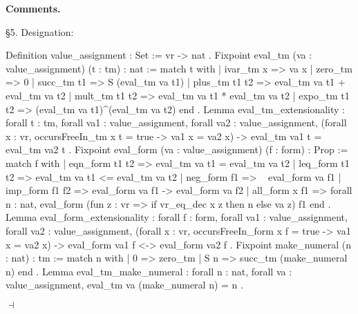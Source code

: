 \documentclass[12pt]{paper}
\newenvironment{context}[1][]
{ \noindent \textbf{{#1}.}
}
{ \hfill $ \dashv $
}
\begin{document}
\begin{context}[Comments]
    \S5. Designation:
    \begin{coqcode}
Definition value_assignment : Set :=
  vr -> nat
.
Fixpoint eval_tm (va : value_assignment) (t : tm) : nat :=
  match t with
  | ivar_tm x => va x
  | zero_tm => 0
  | succ_tm t1 => S (eval_tm va t1)
  | plus_tm t1 t2 => eval_tm va t1 + eval_tm va t2
  | mult_tm t1 t2 => eval_tm va t1 * eval_tm va t2
  | expo_tm t1 t2 => (eval_tm va t1)^(eval_tm va t2)
  end
.
Lemma eval_tm_extensionality :
  forall t : tm,
  forall va1 : value_assignment,
  forall va2 : value_assignment,
  (forall x : vr, occursFreeIn_tm x t = true -> va1 x = va2 x) ->
  eval_tm va1 t = eval_tm va2 t
.
Fixpoint eval_form (va : value_assignment) (f : form) : Prop :=
  match f with
  | eqn_form t1 t2 => eval_tm va t1 = eval_tm va t2
  | leq_form t1 t2 => eval_tm va t1 <= eval_tm va t2
  | neg_form f1 => ~ eval_form va f1
  | imp_form f1 f2 => eval_form va f1 -> eval_form va f2
  | all_form x f1 => forall n : nat, eval_form (fun z : vr => if vr_eq_dec x z then n else va z) f1
  end
.
Lemma eval_form_extensionality :
  forall f : form,
  forall va1 : value_assignment,
  forall va2 : value_assignment,
  (forall x : vr, occursFreeIn_form x f = true -> va1 x = va2 x) ->
  eval_form va1 f <-> eval_form va2 f
.
Fixpoint make_numeral (n : nat) : tm :=
  match n with
  | 0 => zero_tm
  | S n => succ_tm (make_numeral n)
  end
.
Lemma eval_tm_make_numeral :
  forall n : nat,
  forall va : value_assignment,
  eval_tm va (make_numeral n) = n
.
    \end{coqcode}


\end{context}
\end{document}
